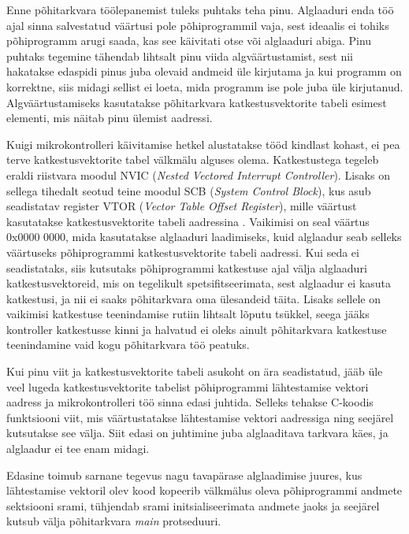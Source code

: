 \documentclass[12pt,a4paper]{article}
\begin{document}
Enne põhitarkvara töölepanemist tuleks puhtaks teha pinu. Alglaaduri enda töö
ajal sinna salvestatud väärtusi pole põhiprogrammil vaja, sest
ideaalis ei tohiks põhiprogramm arugi saada, kas see käivitati otse või
alglaaduri abiga. Pinu puhtaks tegemine tähendab lihtsalt pinu viida
algväärtustamist, sest nii hakatakse edaspidi pinus juba olevaid andmeid üle
kirjutama ja kui programm on korrektne, siis midagi sellist ei loeta, mida
programm ise pole juba üle kirjutanud. Algväärtustamiseks kasutatakse
põhitarkvara katkestusvektorite tabeli esimest elementi, mis näitab pinu ülemist
aadressi.

Kuigi mikrokontrolleri käivitamise hetkel alustatakse tööd kindlast kohast, ei
pea terve katkestusvektorite tabel välkmälu alguses olema. Katkestustega tegeleb
eraldi riistvara moodul NVIC (\textit{Nested Vectored Interrupt Controller}).
Lisaks on sellega tihedalt seotud teine moodul SCB (\textit{System Control
Block}), kus asub seadistatav register VTOR (\textit{Vector Table Offset
Register}), mille väärtust kasutatakse katkestusvektorite tabeli aadressina
\cite{CM3pm}. Vaikimisi on seal väärtus 0x0000 0000, mida kasutatakse alglaaduri
laadimiseks, kuid alglaadur seab selleks väärtuseks põhiprogrammi
katkestusvektorite tabeli aadressi. Kui seda ei seadistataks, siis kutsutaks
põhiprogrammi katkestuse ajal välja alglaaduri katkestusvektoreid, mis on
tegelikult spetsifitseerimata, sest alglaadur ei kasuta katkestusi, ja nii ei
saaks põhitarkvara oma ülesandeid täita. Lisaks sellele on vaikimisi katkestuse
teenindamise rutiin lihtsalt lõputu tsükkel, seega jääks kontroller katkestusse
kinni ja halvatud ei oleks ainult põhitarkvara katkestuse teenindamine vaid kogu
põhitarkvara töö peatuks.

Kui pinu viit ja katkestusvektorite tabeli asukoht on ära seadistatud, jääb üle
veel lugeda katkestusvektorite tabelist põhiprogrammi lähtestamise vektori
aadress ja mikrokontrolleri töö sinna edasi juhtida. Selleks tehakse C-koodis
funktsiooni viit, mis väärtustatakse lähtestamise vektori aadressiga ning
seejärel kutsutakse see välja. Siit edasi on juhtimine juba alglaaditava tarkvara
käes, ja alglaadur ei tee enam midagi.

Edasine toimub sarnane tegevus nagu tavapärase alglaadimise juures, kus
lähtestamise vektoril olev kood kopeerib välkmälus oleva põhiprogrammi andmete
sektsiooni \gls{sram}i, tühjendab \gls{sram}i initsialiseerimata andmete jaoks
ja seejärel kutsub välja põhitarkvara \textit{main} protseduuri.
\end{document}
